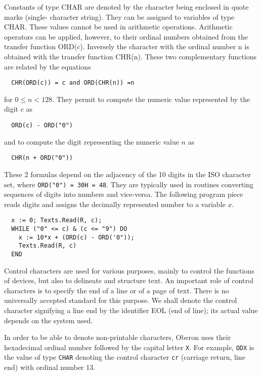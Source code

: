 Constants of type CHAR are denoted by the character being enclosed in quote marks (single-
character string). They can be assigned to variables of type CHAR. These values cannot be used in
arithmetic operations. Arithmetic operators can be applied, however, to their ordinal numbers
obtained from the transfer function ORD(c). Inversely the character with the ordinal number n is
obtained with the transfer function CHR(n). These two complementary functions are related by the
equations
\begin{verbatim}
  CHR(ORD(c)) = c and ORD(CHR(n)) =n
\end{verbatim}
for $0 \le n< 128$. They permit to compute the numeric value represented by the digit $c$ as
\begin{verbatim}
  ORD(c) - ORD("0")
\end{verbatim}
and to compute the digit representing the numeric value $n$ as
\begin{verbatim}
  CHR(n + ORD("0"))
\end{verbatim}
These 2 formulas depend on the adjacency of the 10 digits in the ISO character set, where
\verb|ORD("0") = 30H = 48|. They are typically used in routines converting sequences of digits into
numbers and vice-versa. The following program piece reads digits and assigns the decimally
represented number to a variable $x$.
\begin{verbatim}
  x := 0; Texts.Read(R, c);
  WHILE ("0" <= c) & (c <= "9") DO
    x := 10*x + (ORD(c) - ORD('0"));
    Texts.Read(R, c)
  END
\end{verbatim}
Control characters are used for various purposes, mainly to control the functions of devices, but
also to delineate and structure text. An important role of control characters is to specify the end of a
line or of a page of text. There is no universally accepted standard for this purpose. We shall
denote the control character signifying a line end by the identifier EOL (end of line); its actual value
depends on the system used.

In order to be able to denote non-printable characters, Oberon uses their hexadecimal ordinal
number followed by the capital letter \verb|X|. For example, \verb|ODX| is the value of type \verb|CHAR|
denoting the control character \verb|cr| (carriage return, line end) with ordinal number 13.


